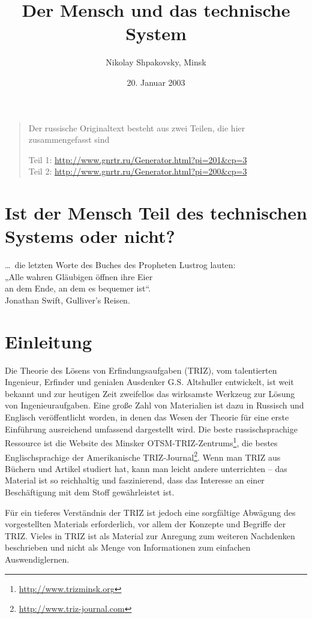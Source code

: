 \documentclass[11pt,a4paper]{article}
\title{Der Mensch und das technische System}
\author{Nikolay Shpakovsky, Minsk}
\date{20. Januar 2003}
\begin{document}
\maketitle

\begin{quote}
  Der russische Originaltext besteht aus zwei Teilen, die hier zusammengefasst
  sind
  
  Teil 1: \url{http://www.gnrtr.ru/Generator.html?pi=201&cp=3}\\
  Teil 2: \url{http://www.gnrtr.ru/Generator.html?pi=200&cp=3}
\end{quote}

\section*{Ist der Mensch Teil des technischen Systems oder nicht?}

\begin{flushright}
 \ldots\ die letzten Worte des Buches des Propheten Lustrog lauten:\\ „Alle
 wahren Gläubigen öffnen ihre Eier\\ an dem Ende, an dem es bequemer
 ist“. \\ Jonathan Swift, Gulliver's Reisen.
\end{flushright}

\section*{Einleitung}
Die Theorie des Lösens von Erfindungsaufgaben (TRIZ), vom talentierten
Ingenieur, Erfinder und genialen Ausdenker G.S. Altshuller entwickelt, ist
weit bekannt und zur heutigen Zeit zweifellos das wirksamste Werkzeug zur
Lösung von Ingenieuraufgaben. Eine große Zahl von Materialien ist dazu in
Russisch und Englisch veröffentlicht worden, in denen das Wesen der Theorie
für eine erste Einführung ausreichend umfassend dargestellt wird.  Die beste
russischsprachige Ressource ist die Website des Minsker
OTSM-TRIZ-Zentrums\footnote{\url{http://www.trizminsk.org}}, die bestes
Englischsprachige der Amerikanische
TRIZ-Journal\footnote{\url{http://www.triz-journal.com}}. Wenn man TRIZ aus
Büchern und Artikel studiert hat, kann man leicht andere unterrichten -- das
Material ist so reichhaltig und faszinierend, dass das Interesse an einer
Beschäftigung mit dem Stoff gewährleistet ist.

Für ein tieferes Verständnis der TRIZ ist jedoch eine sorgfältige Abwägung des
vorgestellten Materials erforderlich, vor allem der Konzepte und Begriffe der
TRIZ.  Vieles in TRIZ ist als Material zur Anregung zum weiteren Nachdenken
beschrieben und nicht als Menge von Informationen zum einfachen
Auswendiglernen.
\end{document}
